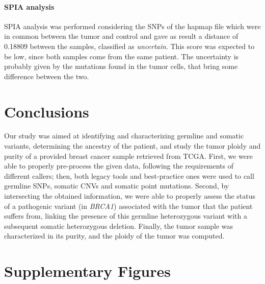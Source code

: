 \documentclass[11pt]{article}
\begin{document}
\paragraph{SPIA analysis}

SPIA analysis was performed considering the SNPs of the hapmap file which were in common between the tumor and control and gave as result a distance of 0.18809 between the samples, classified as \textit{uncertain}. This score was expected to be low, since both samples come from the same patient. The uncertainty is probably given by the mutations found in the tumor cells, that bring some difference between the two.


\section*{Conclusions}

Our study was aimed at identifying and characterizing germline and somatic variants, determining the ancestry of the patient, and study the tumor ploidy and purity of a provided breast cancer sample retrieved from TCGA. 
First, we were able to properly pre-process the given data, following the requirements of different callers; then, both legacy tools and best-practice ones were used to call germline SNPs, somatic CNVs and somatic point mutations. Second, by intersecting the obtained information, we were able to properly assess the status of a pathogenic variant (in \emph{BRCA1}) associated with the tumor that the patient suffers from, linking the presence of this germline heterozygous variant with a subsequent somatic heterozygous deletion. Finally, the tumor sample was characterized in its purity, and the ploidy of the tumor was computed.








\clearpage

\appendix
\renewcommand{\thefigure}{S\arabic{figure}}
\setcounter{figure}{0}


\section*{Supplementary Figures}
\end{document}
